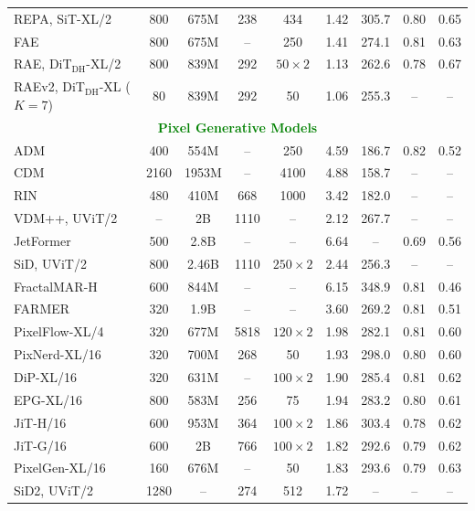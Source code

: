 \documentclass[10pt]{article}
\begin{document}
\begin{table}[!ht]
{\begin{tabular}{l c c c c c c c c}
            REPA, SiT-XL/2 & 800 & 675M & 238 & 434 & 1.42 & 305.7 & 0.80 & 0.65 \\
            FAE & 800 & 675M & -- & 250 & 1.41 & 274.1 & 0.81 & 0.63 \\
            RAE, DiT$_{\mathrm{DH}}$-XL/2 & 800 & 839M & 292 & $50\times2$ & 1.13 & 262.6 & 0.78 & 0.67 \\
            RAEv2, DiT$_{\mathrm{DH}}$-XL ($K{=}7$) & 80 & 839M & 292 & 50 & 1.06 & 255.3 & -- & -- \\
            \midrule
            \multicolumn{9}{c}{\textbf{\textcolor{green}{Pixel Generative Models}}} \\
            \midrule
            ADM & 400 & 554M & -- & 250 & 4.59 & 186.7 & 0.82 & 0.52 \\
            CDM & 2160 & 1953M & -- & 4100 & 4.88 & 158.7 & -- & -- \\
            RIN & 480 & 410M & 668 & 1000 & 3.42 & 182.0 & -- & -- \\
            VDM++, UViT/2 & -- & 2B & 1110 & -- & 2.12 & 267.7 & -- & -- \\
            JetFormer & 500 & 2.8B & -- & -- & 6.64 & -- & 0.69 & 0.56 \\
            SiD, UViT/2 & 800 & 2.46B & 1110 & $250\times2$ & 2.44 & 256.3 & -- & -- \\
            FractalMAR-H & 600 & 844M & -- & -- & 6.15 & 348.9 & 0.81 & 0.46 \\
            FARMER & 320 & 1.9B & -- & -- & 3.60 & 269.2 & 0.81 & 0.51 \\
            PixelFlow-XL/4 & 320 & 677M & 5818 & $120\times2$ & 1.98 & 282.1 & 0.81 & 0.60 \\
            PixNerd-XL/16 & 320 & 700M & 268 & 50 & 1.93 & 298.0 & 0.80 & 0.60 \\
            DiP-XL/16 & 320 & 631M & -- & $100\times2$ & 1.90 & 285.4 & 0.81 & 0.62 \\
            EPG-XL/16 & 800 & 583M & 256 & 75 & 1.94 & 283.2 & 0.80 & 0.61 \\
            JiT-H/16 & 600 & 953M & 364 & $100\times2$ & 1.86 & 303.4 & 0.78 & 0.62 \\
            JiT-G/16 & 600 & 2B & 766 & $100\times2$ & 1.82 & 292.6 & 0.79 & 0.62 \\
            PixelGen-XL/16 & 160 & 676M & -- & 50 & 1.83 & 293.6 & 0.79 & 0.63 \\
            SiD2, UViT/2 & 1280 & -- & 274 & 512 & 1.72 & -- & -- & -- \\

\end{tabular}}
\end{table}
\end{document}
